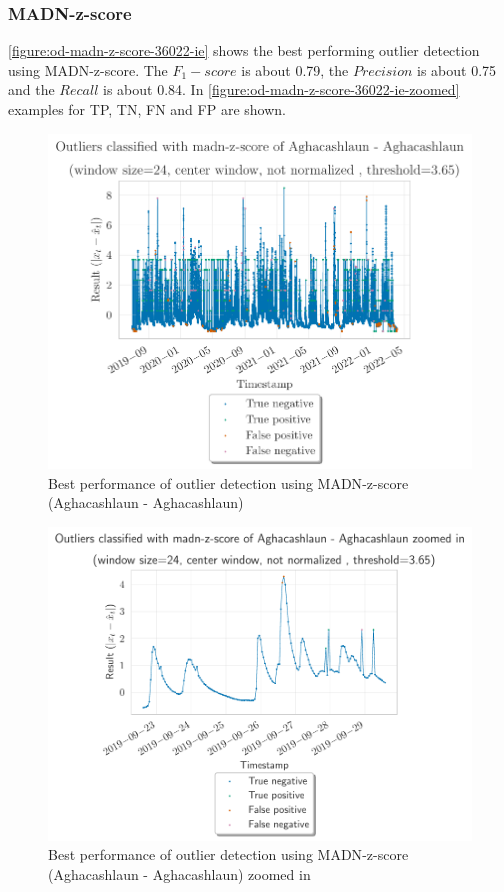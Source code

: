 \subsubsection{MADN-z-score}
\autoref{figure:od-madn-z-score-36022-ie} shows the best performing outlier detection using \ac{MADN}-z-score. The $F_1-score$ is about 0.79, the $Precision$ is about 0.75 and the $Recall$ is about 0.84. In \autoref{figure:od-madn-z-score-36022-ie-zoomed} examples for \ac{TP}, \ac{TN}, \ac{FN} and \ac{FP} are shown.
\begin{figure}[htp]
    \centering 
    \includegraphics{plots/pdfs/36022-ie/od_madn-z-score_36022-ie_all.pdf}
    \caption{Best performance of outlier detection using \ac{MADN}-z-score (Aghacashlaun - Aghacashlaun)}
    \label{figure:od-madn-z-score-36022-ie}
\end{figure}

\begin{figure}[htp]
    \centering 
    \includegraphics{plots/pdfs/36022-ie/od_madn-z-score_36022-ie_zoomed.pdf}
    \caption{Best performance of outlier detection using \ac{MADN}-z-score (Aghacashlaun - Aghacashlaun) zoomed in}
    \label{figure:od-madn-z-score-36022-ie-zoomed}
\end{figure}

